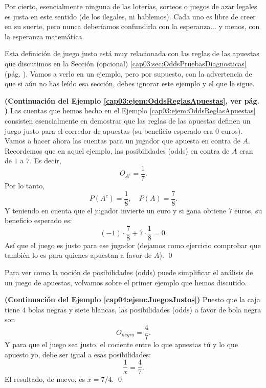 Por cierto, esencialmente ninguna de las loterías, sorteos o juegos de azar legales es justa en este sentido (de los ilegales, ni hablemos). Cada uno es libre de creer en su suerte, pero nunca deberíamos confundirla con la esperanza... y menos, con la esperanza matemática.

Esta definición de juego justo está muy relacionada con las reglas de las apuestas que discutimos en la Sección (opcional) \ref{cap03:sec:OddsPruebasDiagnosticas} (pág. \pageref{cap03:sec:OddsPruebasDiagnosticas}). Vamos a verlo en un ejemplo, pero por supuesto, con la advertencia de que si aún no has leído esa sección, debes ignorar este ejemplo y el que le sigue.
\begin{ejemplo}\label{cap04:ejem:OddsReglasApuestasJuegoJusto}
{\bf (Continuación del Ejemplo \ref{cap03:ejem:OddsReglasApuestas}, ver pág. \pageref{cap03:ejem:OddsReglasApuestas})}
Las cuentas que hemos hecho en el Ejemplo \ref{cap03:ejem:OddsReglasApuestas} consisten esencialmente en demostrar que las reglas de las apuestas definen un juego justo para el corredor de apuestas (su beneficio esperado era $0$ euros). Vamos a hacer ahora las cuentas para un jugador que apuesta en contra de $A$. Recordemos que en aquel ejemplo, las posibilidades (odds) en contra de $A$ eran de $1$ a $7$. Es decir,
\[O_{A^c}=\dfrac{1}{7}.\]
Por lo tanto,
\[P(A^c)=\dfrac{1}{8},\quad  P(A)=\dfrac{7}{8}.\]
Y teniendo en cuenta que el jugador invierte un euro y si gana obtiene $7$ euros, su beneficio esperado es:
\[(-1)\cdot\dfrac{7}{8} + 7\cdot\dfrac{1}{8}=0.\]
Así que el juego es justo para ese jugador (dejamos como ejercicio comprobar que también lo es para quienes apuestan a favor de $A$).
\qed
\end{ejemplo}
Para ver como la noción de posibilidades (odds) puede simplificar el análisis de un juego de apuestas, volvamos sobre el primer ejemplo que hemos discutido.
\begin{ejemplo}
\label{cap04:ejem:JuegosJustos01}
{\bf (Continuación del Ejemplo \ref{cap04:ejem:JuegosJustos})}
Puesto que la caja tiene $4$ bolas negras y siete blancas, las posibilidades (odds) a favor de bola negra son
\[O_{negra}=\dfrac{4}{7}.\]
Y para que el juego sea justo, el cociente entre lo que apuestas tú y lo que apuesto yo, debe ser igual a esas posibilidades:
\[\dfrac{1}{x}=\dfrac{4}{7}.\]
El resultado, de nuevo, es $x=7/4$.
\qed
\end{ejemplo}



